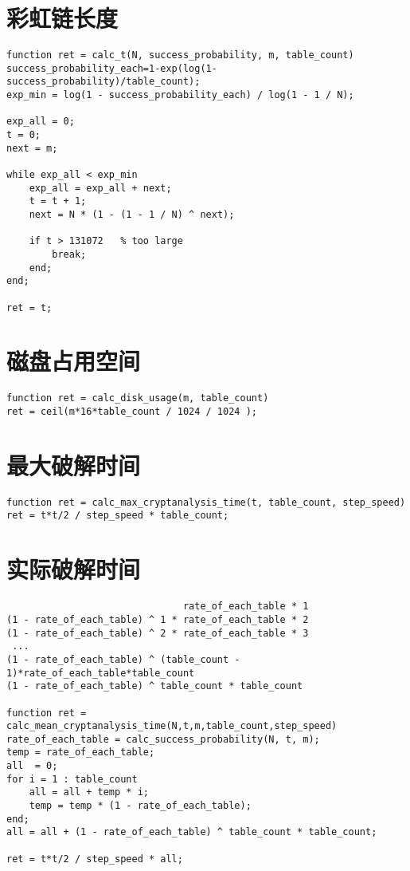 \section{彩虹链长度}
\begin{lstlisting}
function ret = calc_t(N, success_probability, m, table_count)
success_probability_each=1-exp(log(1-success_probability)/table_count);
exp_min = log(1 - success_probability_each) / log(1 - 1 / N);

exp_all = 0;
t = 0;
next = m;

while exp_all < exp_min
	exp_all = exp_all + next;
	t = t + 1;
	next = N * (1 - (1 - 1 / N) ^ next);

	if t > 131072	% too large
		break;
	end;
end;

ret = t;
\end{lstlisting}
\section{磁盘占用空间}
\begin{lstlisting}
function ret = calc_disk_usage(m, table_count)
ret = ceil(m*16*table_count / 1024 / 1024 );
\end{lstlisting}
\section{最大破解时间}
\begin{lstlisting}
function ret = calc_max_cryptanalysis_time(t, table_count, step_speed)
ret = t*t/2 / step_speed * table_count;
\end{lstlisting}
\section{实际破解时间}
\begin{lstlisting}
                               rate_of_each_table * 1 
(1 - rate_of_each_table) ^ 1 * rate_of_each_table * 2 
(1 - rate_of_each_table) ^ 2 * rate_of_each_table * 3
 ...
(1 - rate_of_each_table) ^ (table_count - 1)*rate_of_each_table*table_count
(1 - rate_of_each_table) ^ table_count * table_count

function ret = calc_mean_cryptanalysis_time(N,t,m,table_count,step_speed)
rate_of_each_table = calc_success_probability(N, t, m);
temp = rate_of_each_table;
all  = 0;
for i = 1 : table_count
    all = all + temp * i;
    temp = temp * (1 - rate_of_each_table);
end;
all = all + (1 - rate_of_each_table) ^ table_count * table_count;

ret = t*t/2 / step_speed * all;
\end{lstlisting}
